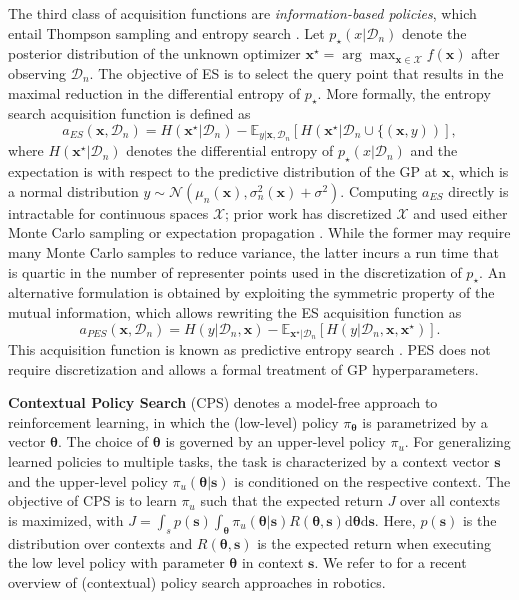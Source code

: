 \documentclass[10pt,letterpaper]{article} %
\def\D{\mathrm{d}}
\begin{document}
The third class of acquisition functions are \emph{information-based policies},
which entail Thompson sampling and entropy search
\citep[ES,][]{villemonteix_informational_2008, hennig_entropy_2012,hernandez-lobato_predictive_2014}.
Let $p_\star(x \vert \mathcal{D}_n)$ denote the
posterior distribution of the unknown optimizer $\mathbf{x}^\star = \arg\max_{\mathbf{x} \in \mathcal{X}} f(\mathbf{x})$  after
observing $\mathcal{D}_n$. The objective of ES is to select the query point that
results in the maximal reduction in the differential entropy of $p_\star$. More
formally, the entropy search acquisition function is defined as
$$ a_{ES}(\mathbf{x}, \mathcal{D}_n)
  = H(\mathbf{x}^\star \vert \mathcal{D}_n) - \mathbb{E}_{y \vert \mathbf{x}, \mathcal{D}_n}
    [H(\mathbf{x}^\star \vert \mathcal{D}_n \cup \{(\mathbf{x}, y))],$$
where $H(\mathbf{x}^\star \vert \mathcal{D}_n)$ denotes the differential entropy
of $p_\star(x \vert \mathcal{D}_n)$ and the expectation is with respect to the
predictive distribution of the GP at $\mathbf{x}$, which is a normal
distribution $y \sim \mathcal{N}(\mu_{n}(\mathbf{x}), \sigma_{n}^2(\mathbf{x}) +
\sigma^2)$. Computing $a_{ES}$ directly is intractable for continuous spaces
$\mathcal{X}$; prior work has discretized $\mathcal{X}$ and used either Monte
Carlo sampling \cite{villemonteix_informational_2008} or expectation propagation
\cite{hennig_entropy_2012}. While the former may require many Monte Carlo
samples to reduce variance, the latter incurs a run time that is quartic in the
number of representer points used in the discretization of $p_\star$. An
alternative formulation is obtained by exploiting the symmetric property of the
mutual information, which allows rewriting the ES acquisition function as
$$ a_{PES}(\mathbf{x}, \mathcal{D}_n)
  = H(y \vert \mathcal{D}_n, \mathbf{x}) - \mathbb{E}_{\mathbf{x}^\star \vert \mathcal{D}_n}
    [H(y \vert \mathcal{D}_n, \mathbf{x}, \mathbf{x}^\star)].$$
This acquisition function is known as predictive entropy search
\citep[PES,][]{hernandez-lobato_predictive_2014}. PES does not require discretization
and allows a formal treatment of GP hyperparameters.


\textbf{Contextual Policy Search} (CPS)
denotes a model-free approach to reinforcement learning,
in which the (low-level) policy $\pi_\mathbf{\theta}$ is parametrized by a vector
$\mathbf{\theta}$. The choice of $\mathbf{\theta}$ is governed by an upper-level policy
$\pi_{u}$. For generalizing learned policies to multiple tasks,
the task is characterized
by a context vector $\mathbf{s}$ and the upper-level policy
$\pi_{u}(\mathbf{\theta}\vert \mathbf{s})$ is conditioned on the respective
context. The objective of CPS is to learn
$\pi_{u}$ such that the expected return $J$ over all contexts is
maximized, with $J = \int_s p(\mathbf{s}) \int_\mathbf{\theta}
\pi_{u}(\mathbf{\theta}\vert \mathbf{s}) R(\mathbf{\theta}, \mathbf{s}) \D{\mathbf{\theta}
} \D{\mathbf{s}}$. Here, $p(\mathbf{s})$ is the distribution over contexts and
$R(\mathbf{\theta}, \mathbf{s})$ is the expected return when executing the low
level policy with parameter $\mathbf{\theta}$ in context $\mathbf{s}$. We refer to
\citet{deisenroth_survey_2013} for a recent overview of (contextual) policy
search approaches in robotics.
\end{document}
